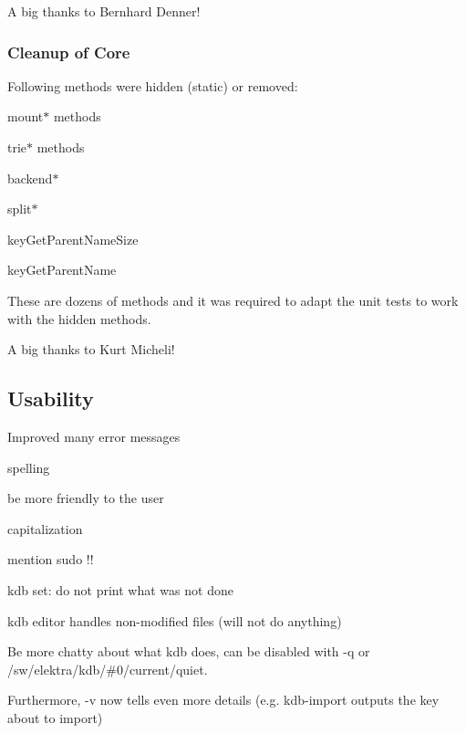 A big thanks to Bernhard Denner!

\subsubsection*{Cleanup of Core}

Following methods were hidden ({\ttfamily static}) or removed\+:


\begin{DoxyItemize}
\item {\ttfamily mount$\ast$} methods
\item {\ttfamily trie$\ast$} methods
\item {\ttfamily backend$\ast$}
\item {\ttfamily split$\ast$}
\item {\ttfamily key\+Get\+Parent\+Name\+Size}
\item {\ttfamily key\+Get\+Parent\+Name}
\end{DoxyItemize}

These are dozens of methods and it was required to adapt the unit tests to work with the hidden methods.

A big thanks to Kurt Micheli!

\subsection*{Usability}


\begin{DoxyItemize}
\item Improved many error messages
\begin{DoxyItemize}
\item spelling
\item be more friendly to the user
\item capitalization
\item mention {\ttfamily sudo !!}
\end{DoxyItemize}
\item {\ttfamily kdb set}\+: do not print what was not done
\item {\ttfamily kdb editor} handles non-\/modified files (will not do anything)
\item Be more chatty about what {\ttfamily kdb} does, can be disabled with {\ttfamily -\/q} or {\ttfamily /sw/elektra/kdb/\#0/current/quiet}.
\item Furthermore, {\ttfamily -\/v} now tells even more details (e.\+g. {\ttfamily kdb-\/import} outputs the key about to import)
\end{DoxyItemize}

